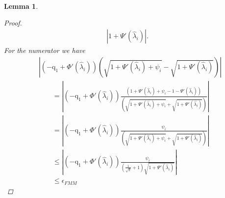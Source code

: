 \documentclass{article}
\newcommand{\labs}{\left|}
\newcommand{\rabs}{\right|}
\newcommand{\lpar}{\left(}
\newcommand{\rpar}{\right)}
\newtheorem{lemma}{Lemma}[section]
\newcommand\vecq{\boldsymbol{\mathrm{q}}}
\begin{document}
\begin{lemma}
\begin{proof}
\begin{align}
            \labs
                1+\Psi'(\widehat\lambda_i)
            \rabs.
            \label{eq:fmm_approximate_inner_product_7}
        \end{align}
        For the numerator we have
        \begin{align}
            &\labs
                    \lpar
                        -\vecq_1
                        +
                        \Phi'(\widehat\lambda_i)
                    \rpar
                    \lpar
                        \sqrt{1+\Psi'(\widehat\lambda_i)+\psi_i}
                        -
                        \sqrt{1+\Psi'(\widehat\lambda_i)}
                    \rpar
            \rabs
            \nonumber
            \\
            &\qquad=
            \labs
                \lpar
                    -\vecq_1
                    +
                    \Phi'(\widehat\lambda_i)
                \rpar
                \frac{
                    \lpar
                        1+\Psi'(\widehat\lambda_i)+\psi_i
                        -
                        1-\Psi'(\widehat\lambda_i)
                    \rpar
                }
                {
                    \lpar
                        \sqrt{1+\Psi'(\widehat\lambda_i)+\psi_i}
                        +
                        \sqrt{1+\Psi'(\widehat\lambda_i)}
                    \rpar
                }
            \rabs
            \nonumber
            \\
            &\qquad=
            \labs
                \lpar
                    -\vecq_1
                    +
                    \Phi'(\widehat\lambda_i)
                \rpar
                \frac{
                    \psi_i
                }
                {
                    \lpar
                        \sqrt{1+\Psi'(\widehat\lambda_i)+\psi_i}
                        +
                        \sqrt{1+\Psi'(\widehat\lambda_i)}
                    \rpar
                }
            \rabs
            \nonumber
            \\
            &\qquad\leq
            \labs
                \lpar
                    -\vecq_1
                    +
                    \Phi'(\widehat\lambda_i)
                \rpar
                \frac{
                    \psi_i
                }
                {
                        (\frac{1}{\sqrt{2}}+1)
                        \sqrt{1+\Psi'(\widehat\lambda_i)}
                }
            \rabs
            \nonumber
            \\
            &\qquad\leq
            \epsilon_{FMM}

\end{align}
\end{proof}
\end{lemma}
\end{document}
